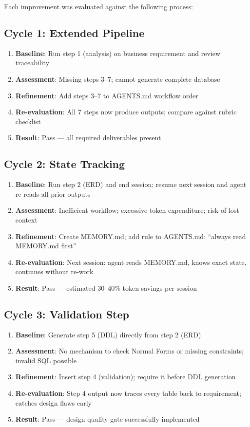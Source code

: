 \documentclass[12pt,a4paper]{article}
\begin{document}
Each improvement was evaluated against the following process:

\subsection{Cycle 1: Extended Pipeline}
\begin{enumerate}
    \item \textbf{Baseline}: Run step 1 (analysis) on business requirement and review traceability
    \item \textbf{Assessment}: Missing steps 3--7; cannot generate complete database
    \item \textbf{Refinement}: Add steps 3--7 to AGENTS.md workflow order
    \item \textbf{Re-evaluation}: All 7 steps now produce outputs; compare against rubric checklist
    \item \textbf{Result}: Pass — all required deliverables present
\end{enumerate}

\subsection{Cycle 2: State Tracking}
\begin{enumerate}
    \item \textbf{Baseline}: Run step 2 (ERD) and end session; resume next session and agent re-reads all prior outputs
    \item \textbf{Assessment}: Inefficient workflow; excessive token expenditure; risk of lost context
    \item \textbf{Refinement}: Create MEMORY.md; add rule to AGENTS.md: ``always read MEMORY.md first''
    \item \textbf{Re-evaluation}: Next session: agent reads MEMORY.md, knows exact state, continues without re-work
    \item \textbf{Result}: Pass — estimated 30--40\% token savings per session
\end{enumerate}

\subsection{Cycle 3: Validation Step}
\begin{enumerate}
    \item \textbf{Baseline}: Generate step 5 (DDL) directly from step 2 (ERD)
    \item \textbf{Assessment}: No mechanism to check Normal Forms or missing constraints; invalid SQL possible
    \item \textbf{Refinement}: Insert step 4 (validation); require it before DDL generation
    \item \textbf{Re-evaluation}: Step 4 output now traces every table back to requirement; catches design flaws early
    \item \textbf{Result}: Pass — design quality gate successfully implemented
\end{enumerate}
\end{document}
